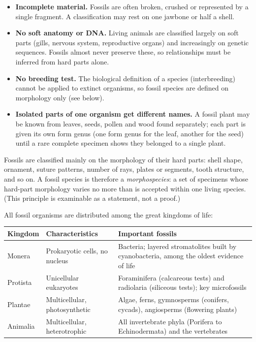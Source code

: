 \documentclass[11pt]{article}
\newcommand{\cle}[1]{{\popxbold\color{popdark}#1}}
\newcounter{popsec}
\newcounter{popsub}
\newcommand{\courssub}[1]{%
  \stepcounter{popsub}%
  \par\vspace{9pt}\noindent{\popxbold\fontsize{11.5}{13}\selectfont\color{popink}{\color{poporange}\thepopsec.\thepopsub}\hspace{6pt}#1}\par\nopagebreak\vspace{4pt}
}
\begin{document}
\begin{itemize}
\item \textbf{Incomplete material.} Fossils are often broken, crushed or represented by a single fragment. A classification may rest on one jawbone or half a shell.
\item \textbf{No soft anatomy or DNA.} Living animals are classified largely on soft parts (gills, nervous system, reproductive organs) and increasingly on genetic sequences. Fossils almost never preserve these, so relationships must be inferred from hard parts alone.
\item \textbf{No breeding test.} The biological definition of a species (interbreeding) cannot be applied to extinct organisms, so fossil species are defined on morphology only (see below).
\item \textbf{Isolated parts of one organism get different names.} A fossil plant may be known from leaves, seeds, pollen and wood found separately; each part is given its own \cle{form genus} (one form genus for the leaf, another for the seed) until a rare complete specimen shows they belonged to a single plant.
\end{itemize}

\begin{propriete}
Fossils are classified mainly on the \cle{morphology of their hard parts}: shell shape, ornament, suture patterns, number of rays, plates or segments, tooth structure, and so on. A fossil species is therefore a \emph{morphospecies}: a set of specimens whose hard-part morphology varies no more than is accepted within one living species. (This principle is examinable as a statement, not a proof.)
\end{propriete}

\courssub{The Major Fossil Kingdoms}

All fossil organisms are distributed among the great kingdoms of life:

\begin{center}
\begin{tabularx}{\linewidth}{|l|X|X|}
\hline
\rowcolor{popblueL} \textbf{Kingdom} & \textbf{Characteristics} & \textbf{Important fossils} \\
\hline
Monera & Prokaryotic cells, no nucleus & Bacteria; layered \cle{stromatolites} built by cyanobacteria, among the oldest evidence of life \\
\hline
Protista & Unicellular eukaryotes & \cle{Foraminifera} (calcareous tests) and \cle{radiolaria} (siliceous tests); key microfossils \\
\hline
Plantae & Multicellular, photosynthetic & Algae, ferns, gymnosperms (conifers, cycads), angiosperms (flowering plants) \\
\hline
Animalia & Multicellular, heterotrophic & All invertebrate phyla (Porifera to Echinodermata) and the vertebrates \\
\hline
\end{tabularx}
\end{center}
\end{document}

